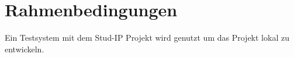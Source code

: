 \section{Rahmenbedingungen}

Ein Testsystem mit dem Stud-IP Projekt wird genutzt um das Projekt lokal zu entwickeln.